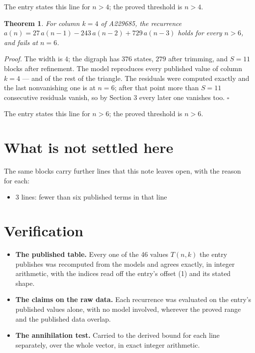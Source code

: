 \documentclass[11pt]{article}
\newtheorem{theorem}{Theorem}
\theoremstyle{definition}
\begin{document}
The entry states this line for $n > 4$; the proved threshold is $n > 4$.

\begin{theorem} For column $k = 4$ of A229685, the recurrence $a(n) = 27\,a(n-1) - 243\,a(n-2) + 729\,a(n-3)$ holds for every $n > 6$, and fails at $n = 6$.\end{theorem}

{\itshape Proof.} The width is $4$; the digraph has $376$ states, $279$ after trimming, and $S = 11$ blocks after refinement. The model reproduces every published value of column $k = 4$ --- and of the rest of the triangle. The residuals were computed exactly and the last nonvanishing one is at $n = 6$; after that point more than $S = 11$ consecutive residuals vanish, so by Section 3 every later one vanishes too. $\square$

The entry states this line for $n > 6$; the proved threshold is $n > 6$.

\section{What is not settled here}

The same blocks carry further lines that this note leaves open, with the reason for each:

\begin{itemize}

\item 3 lines: fewer than six published terms in that line

\end{itemize}

\section{Verification}

\begin{itemize}

\item {\bfseries The published table.} Every one of the 46 values $T(n,k)$ the entry publishes was recomputed from the models and agrees exactly, in integer arithmetic, with the indices read off the entry's offset (1) and its stated shape.

\item {\bfseries The claims on the raw data.} Each recurrence was evaluated on the entry's published values alone, with no model involved, wherever the proved range and the published data overlap.

\item {\bfseries The annihilation test.} Carried to the derived bound for each line separately, over the whole vector, in exact integer arithmetic.

\end{itemize}
\end{document}
